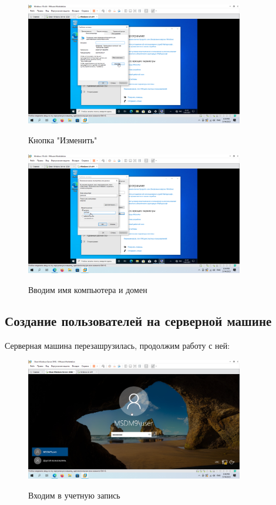 \documentclass[a4paper]{article}
\begin{document}
  \begin{figure}[H]
    \centering
    \includegraphics[width=0.85\textwidth]{5_0074}
    \label{img:74}
    \caption{Кнопка "Изменить"}
  \end{figure}

  \begin{figure}[H]
    \centering
    \includegraphics[width=0.85\textwidth]{5_0075}
    \label{img:75}
    \caption{Вводим имя компьютера и домен}
  \end{figure}

  \subsection{Создание пользователей на серверной машине}

  Серверная машина перезашрузилась, продолжим работу с ней:

  \begin{figure}[H]
    \centering
    \includegraphics[width=0.85\textwidth]{5_0076}
    \label{img:76}
    \caption{Входим в учетную запись}
  \end{figure}
\end{document}

